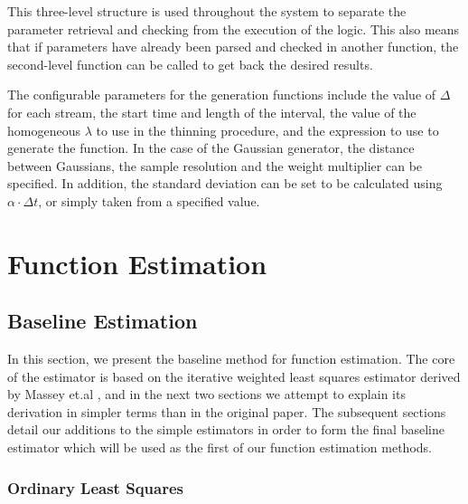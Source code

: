 \documentclass[a4paper,11pt]{article}
\begin{document}
   This three-level structure is used throughout the system to separate the
   parameter retrieval and checking from the execution of the logic. This also
   means that if parameters have already been parsed and checked in another
   function, the second-level function can be called to get back the desired
   results.

   The configurable parameters for the generation functions include the value
   of $\Delta$ for each stream, the start time and length of the interval, the
   value of the homogeneous $\lambda$ to use in the thinning procedure, and the
   expression to use to generate the function. In the case of the Gaussian
   generator, the distance between Gaussians, the sample resolution and the
   weight multiplier can be specified. In addition, the standard deviation can
   be set to be calculated using $\alpha\cdot\Delta t$, or simply taken from a
   specified value.
\section{Function Estimation}
\label{sec-6}
\subsection{Baseline Estimation}
\label{sec-6-1}

   In this section, we present the baseline method for function estimation. The
   core of the estimator is based on the iterative weighted least squares estimator
   derived by Massey et.al \cite{massey1996estimating}, and in the next two
   sections we attempt to explain its derivation in simpler terms than in the
   original paper. The subsequent sections detail our additions to the simple
   estimators in order to form the final baseline estimator which will be used as
   the first of our function estimation methods.
\subsubsection{Ordinary Least Squares}
\label{sec-6-1-1}
\end{document}

